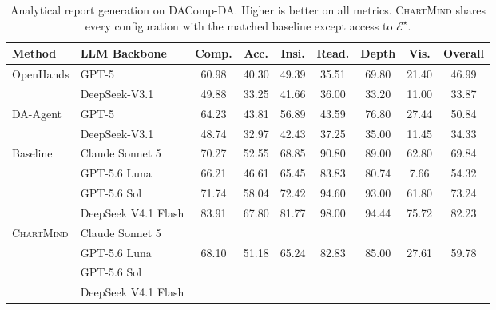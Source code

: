 \documentclass{article}
\newcommand{\method}{\textsc{ChartMind}\xspace}
\begin{document}
\begin{table}[t]
\caption{Analytical report generation on DAComp-DA. Higher is better on all metrics. \method{} shares every configuration with the matched baseline except access to $\mathcal{E}^{\star}$.}
\label{tab:dacomp-matrix}
\centering
\small
\setlength{\tabcolsep}{3pt}
\begin{tabular}{@{}llccccccc@{}}
\toprule
Method & LLM Backbone & Comp. & Acc. & Insi. & Read. & Depth & Vis. & Overall \\
\midrule
\multirow{2}{*}{OpenHands} & GPT-5 & 60.98 & 40.30 & 49.39 & 35.51 & 69.80 & 21.40 & 46.99 \\
                          & DeepSeek-V3.1 & 49.88 & 33.25 & 41.66 & 36.00 & 33.20 & 11.00 & 33.87 \\
\midrule
\multirow{2}{*}{DA-Agent} & GPT-5 & 64.23 & 43.81 & 56.89 & 43.59 & 76.80 & 27.44 & 50.84 \\
                         & DeepSeek-V3.1 & 48.74 & 32.97 & 42.43 & 37.25 & 35.00 & 11.45 & 34.33 \\
\midrule
\multirow{4}{*}{Baseline}
& Claude Sonnet 5 & 70.27 & 52.55 & 68.85 & 90.80 & 89.00 & 62.80 & 69.84 \\
& GPT-5.6 Luna & 66.21 & 46.61 & 65.45 & 83.83 & 80.74 & 7.66 & 54.32 \\
& GPT-5.6 Sol & 71.74 & 58.04 & 72.42 & 94.60 & 93.00 & 61.80 & 73.24 \\
& DeepSeek V4.1 Flash & 83.91 & 67.80 & 81.77 & 98.00 & 94.44 & 75.72 & 82.23 \\
\midrule
\multirow{4}{*}{\method{}}
& Claude Sonnet 5 &  &  &  &  &  &  &  \\
& GPT-5.6 Luna & 68.10 & 51.18 & 65.24 & 82.83 & 85.00 & 27.61 & 59.78 \\
& GPT-5.6 Sol &  &  &  &  &  &  &  \\
& DeepSeek V4.1 Flash &  &  &  &  &  &  &  \\
\bottomrule
\end{tabular}
\end{table}
\end{document}
